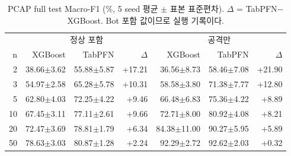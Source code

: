 \begin{table}[H]
\centering\small
\caption{PCAP full test Macro-F1 (\%, 5 seed 평균 $\pm$ 표본 표준편차). $\Delta$ = TabPFN$-$XGBoost. Bot 포함 값이므로 실행 기록이다.}
\begin{tabular}{r|rrr|rrr}
\toprule
& \multicolumn{3}{c|}{정상 포함} & \multicolumn{3}{c}{공격만}\\
n & XGBoost & TabPFN & $\Delta$ & XGBoost & TabPFN & $\Delta$\\\midrule
2  & 38.66$\pm$3.62 & 55.88$\pm$5.87 & +17.21 & 36.56$\pm$8.73 & 58.46$\pm$7.08 & +21.90\\
3  & 54.97$\pm$2.58 & 65.28$\pm$5.78 & +10.31 & 58.58$\pm$3.80 & 71.38$\pm$7.77 & +12.80\\
5  & 62.80$\pm$4.03 & 72.25$\pm$4.22 & +9.46  & 66.48$\pm$6.83 & 75.36$\pm$4.22 & +8.89\\
10 & 67.45$\pm$3.11 & 77.11$\pm$2.61 & +9.66  & 72.71$\pm$8.00 & 80.92$\pm$4.08 & +8.21\\
20 & 72.47$\pm$3.69 & 78.81$\pm$1.79 & +6.34  & 84.38$\pm$11.00 & 90.27$\pm$5.95 & +5.89\\
50 & 78.63$\pm$3.03 & 80.87$\pm$1.28 & +2.24  & 92.29$\pm$2.72 & 92.62$\pm$2.03 & +0.32\\
\bottomrule
\end{tabular}
\end{table}


